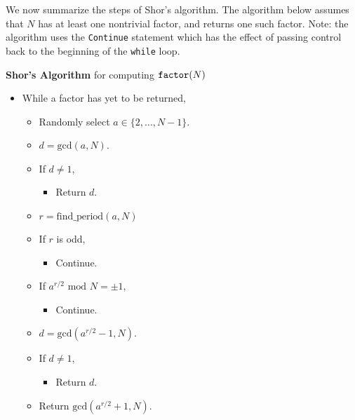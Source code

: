 \documentclass [12pt]{article}
\theoremstyle{definition}
\begin{document}
\newpage
We now summarize the steps of Shor's algorithm. The algorithm below assumes that $N$ has at least one nontrivial factor, and returns one such factor.
Note: the algorithm uses the \texttt{Continue} statement which has the effect of passing control back to the beginning of the \texttt{while} loop.

\textbf{Shor's Algorithm} for computing $\mbox{\texttt{factor}}(N)$

\begin{itemize}
\renewcommand{\labelitemi}{}
\renewcommand{\labelitemii}{}
\renewcommand{\labelitemiii}{}

\item While a factor has yet to be returned,

\begin{itemize}
\item Randomly select $a\in\{2,\ldots,N-1\}$.
\item $d = \mbox{gcd}(a,N)$.
\item If $d \not= 1$,

\begin{itemize}
\item Return $d$.
\end{itemize}

\item $r = \mbox{find\_period}(a,N)$
\item If $r$ is odd,

\begin{itemize}
\item Continue.
\end{itemize}

\item If $a^{r/2} \mbox{ mod } N = \pm 1$,

\begin{itemize}
\item Continue.
\end{itemize}

\item $d = \mbox{gcd}(a^{r/2}-1,N)$.
\item If $d \not= 1$,

\begin{itemize}
\item Return $d$.
\end{itemize}

\item Return $\mbox{gcd}(a^{r/2}+1,N)$.

\end{itemize}

\end{itemize}
\end{document}

